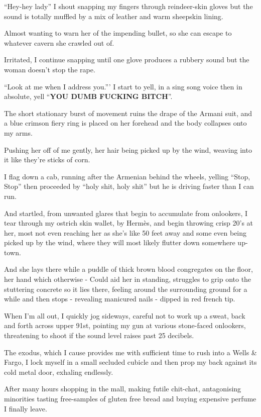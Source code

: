 \documentclass[19pt,openany]{book}
\begin{document}
``Hey-hey lady'' I shout
snapping my fingers through
reindeer-skin gloves
but the sound is totally
muffled by a mix of
leather and warm sheepskin lining.

Almost wanting to warn her of
the impending bullet, so she
can escape to whatever cavern she
crawled out of.

Irritated, I continue snapping
until one glove
produces a rubbery sound but
the woman doesn't stop the rape.

``Look at me
when I address you.''' I start
to yell, in a sing song voice
then in absolute, yell
``\textbf{YOU DUMB FUCKING BITCH}''.

The short stationary burst of
movement ruins the drape
of the Armani suit, and
a blue crimson fiery ring is placed
on her forehead and the body collapses onto
my arms.

Pushing her off of me gently, her hair being
picked up by the wind, weaving into it like
they're sticks of corn.

I flag down a cab, running after the
Armenian behind the wheels, yelling
``Stop, Stop'' then proceeded
by ``holy shit, holy shit''
but he is driving faster than I can run.

And startled, from unwanted
glares that begin to accumulate
from onlookers, I
tear through my ostrich skin
wallet, by
Hermès, and begin
throwing crisp 20's at her,
most not even
reaching her
as she's like 50 feet away and
some even being picked up by the
wind, where they will most
likely flutter down somewhere
up-town.

And she lays there while a
puddle of thick brown blood congregates on the floor,
her hand which otherwise - Could aid her in standing,
struggles to grip onto the stuttering concrete
so it lies there, feeling around
the surrounding ground
for a while and then stops - revealing
manicured nails - dipped in
red french tip.

When I'm all out,
I quickly jog sideways,
careful not to work up a sweat,
back and forth across
upper 91st, pointing
my gun
at various stone-faced
onlookers, threatening
to shoot if the sound
level raises past 25 decibels.

The exodus, which I cause
provides me with sufficient time
to rush into a Wells \& Fargo,
I lock myself in a small
secluded cubicle and then
prop my back against its cold metal door,
exhaling endlessly.

After many hours
shopping in the mall,
making futile chit-chat,
antagonising minorities
tasting free-samples
of gluten free bread and
buying expensive perfume
I finally leave.
\end{document}
